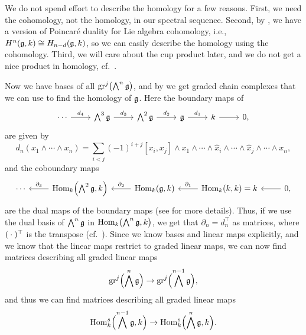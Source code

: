 \begin{remark}
  We do not spend effort to describe the homology for a few reasons. First, we need the cohomology, not the homology, in our spectral sequence. Second, by \cite[Chap.~1~§3.6]{Fuks}, we have a version of Poincaré duality for Lie algebra cohomology, i.e., $H^{n}(\mathfrak{g},k) \cong H_{n-d}(\mathfrak{g},k)$, so we can easily describe the homology using the cohomology. Third, we will care about the cup product later, and we do not get a nice product in homology, cf.\ \cite[Chap.~1~§3.2]{Fuks}.
\end{remark}

Now we have bases of all $\operatorname{gr}^{j}\bigl( \bigwedge^{n}\mathfrak{g} \bigr)$, and by \cite[Chap.~1~§3.7]{Fuks} we get graded chain complexes that we can use to find the homology of $\mathfrak{g}$. Here the boundary maps of
\[
  \begin{tikzcd}
    \cdots \ar[r,"d_{4}"] & \bigwedge^{3}\lie{g} \ar[r,"d_{3}"] & \bigwedge^{2}\lie{g} \ar[r,"d_{2}"] & \lie{g} \ar[r,"d_{1}"] & k \ar[r] &  0,
  \end{tikzcd}
\]
are given by
\begin{equation*}
  d_{n}(x_{1} \wedge \dotsb \wedge x_{n}) = \sum_{i<j} (-1)^{i+j}[x_{i},x_{j}]\wedge x_{1} \wedge \dotsb \wedge \widehat{x}_{i} \wedge \dotsb \wedge \widehat{x}_{j} \wedge \dotsb \wedge x_{n},
\end{equation*}
and the coboundary maps
\[
  \begin{tikzcd}
    \cdots & \ar[l,"\partial_{3}"'] \Hom_{k}\Bigl( \bigwedge^{2}\lie{g}, k \Bigr) & \ar[l,"\partial_{2}"'] \Hom_{k}(\lie{g},k) & \ar[l,"\partial_{1}"'] \Hom_{k}(k, k) = k &  \ar[l] 0,
  \end{tikzcd}
\]
are the dual maps of the boundary maps (see \cite[Chap.~1~§3.1]{Fuks} for more details). Thus, if we use the dual basis of $\bigwedge^{n}\mathfrak{g}$ in $\operatorname{Hom}_{k}\bigl( \bigwedge^{n} \mathfrak{g},k \bigr)$, we get that $\partial_{n} = d_{n}^{\top}$ as matrices, where $(\:\cdot\:)^{\top}$ is the transpose (cf.\ ). Since we know bases and linear maps explicitly, and we know that the linear maps restrict to graded linear maps, we can now find matrices describing all graded linear maps
\begin{equation*}
  \operatorname{gr}^{j} \Bigl( \bigwedge^{n}\mathfrak{g} \Bigr) \to \operatorname{gr}^{j} \Bigl( \bigwedge^{n-1}\mathfrak{g} \Bigr),
\end{equation*}
and thus we can find matrices describing all graded linear maps
\begin{equation*}
  \operatorname{Hom}_{k}^{s}\Bigl( \bigwedge^{n-1}\mathfrak{g},k \Bigr) \to \operatorname{Hom}_{k}^{s}\Bigl( \bigwedge^{n}\mathfrak{g}, k \Bigr).
\end{equation*}

